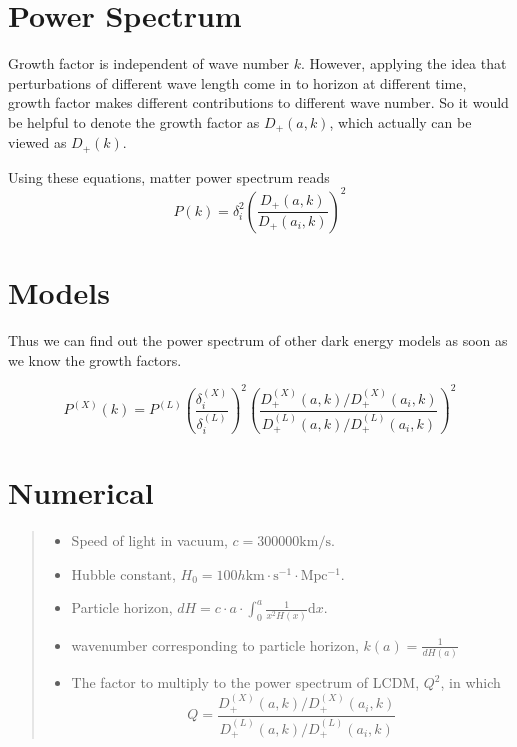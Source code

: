 \documentclass{article}
\begin{document}
\section{Power Spectrum}

Growth factor is independent of wave number $k$. However, applying the idea that perturbations of different wave length come in to horizon at different time, growth factor makes different contributions to different wave number. So it would be helpful to denote the growth factor as $D_+(a,k)$, which actually can be viewed as $D_+(k)$.

Using these equations, matter power spectrum reads
\begin{equation}
P(k)=\delta_i^2 \left(\frac{D_+(a,k)}{D_+(a_i,k)}\right)^2
\end{equation}

\section{Models}

Thus we can find out the power spectrum of other dark energy models as soon as we know the growth factors.

\begin{equation}
P^{(X)}(k)=P^{(L)}\left(\frac{\delta^{(X)}_i}{\delta^{(L)}_i}\right)^2 \left( \frac{D^{(X)}_+(a,k)/D^{(X)}_+(a_i,k)}{D^{(L)}_+(a,k)/D^{(L)}_+(a_i,k)}  \right)^2
\end{equation}









\section{Numerical}

\begin{quote}
\begin{itemize}
\item
Speed of light in vacuum, $c=300000\mathrm {km/s}$.
\item
Hubble constant, $H_0=100 h \mathrm{km\cdot s^{-1}\cdot Mpc^{-1}}$.
\item
Particle horizon, $dH=c\cdot a\cdot \int^a_0 \frac{1}{x^2 H(x)}\mathrm dx$.
\item
wavenumber corresponding to particle horizon, $k(a)=\frac{1}{dH(a)}$
\item
The factor to multiply to the power spectrum of LCDM,  $Q^2$, in which \begin{equation}Q=\frac{D^{(X)}_+(a,k)/D^{(X)}_+(a_i,k)}{D^{(L)}_+(a,k)/D^{(L)}_+(a_i,k)}\end{equation}

\end{itemize}
\end{quote}
\end{document}
